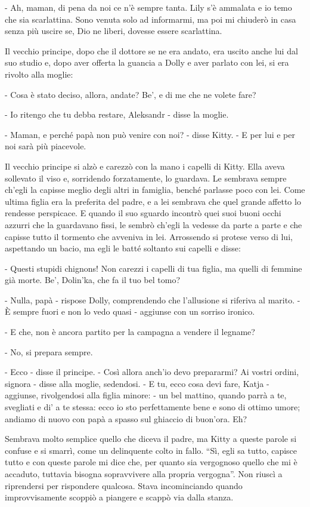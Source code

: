 - Ah, maman, di pena da noi ce n'è sempre tanta. Lily s'è ammalata e io temo che sia scarlattina. Sono venuta solo ad informarmi, ma poi mi chiuderò in casa senza più uscire se, Dio ne liberi, dovesse essere scarlattina. 

Il vecchio principe, dopo che il dottore se ne era andato, era uscito anche lui dal suo studio e, dopo aver offerta la guancia a Dolly e aver parlato con lei, si era rivolto alla moglie: 

- Cosa è stato deciso, allora, andate? Be', e di me che ne volete fare? 

- Io ritengo che tu debba restare, Aleksandr - disse la moglie. 

- Maman, e perché papà non può venire con noi? - disse Kitty. - E per lui e per noi sarà più piacevole. 

Il vecchio principe si alzò e carezzò con la mano i capelli di Kitty. Ella aveva sollevato il viso e, sorridendo forzatamente, lo guardava. Le sembrava sempre ch'egli la capisse meglio degli altri in famiglia, benché parlasse poco con lei. Come ultima figlia era la preferita del padre, e a lei sembrava che quel grande affetto lo rendesse perspicace. E quando il suo sguardo incontrò quei suoi buoni occhi azzurri che la guardavano fissi, le sembrò ch'egli la vedesse da parte a parte e che capisse tutto il tormento che avveniva in lei. Arrossendo si protese verso di lui, aspettando un bacio, ma egli le batté soltanto sui capelli e disse: 

- Questi stupidi chignons! Non carezzi i capelli di tua figlia, ma quelli di femmine già morte. Be', Dolin'ka, che fa il tuo bel tomo? 

- Nulla, papà - rispose Dolly, comprendendo che l'allusione si riferiva al marito. - È sempre fuori e non lo vedo quasi - aggiunse con un sorriso ironico. 

- E che, non è ancora partito per la campagna a vendere il legname? 

- No, si prepara sempre. 

- Ecco - disse il principe. - Così allora anch'io devo prepararmi? Ai vostri ordini, signora - disse alla moglie, sedendosi. - E tu, ecco cosa devi fare, Katja - aggiunse, rivolgendosi alla figlia minore: - un bel mattino, quando parrà a te, svegliati e di' a te stessa: ecco io sto perfettamente bene e sono di ottimo umore; andiamo di nuovo con papà a spasso sul ghiaccio di buon'ora. Eh? 

Sembrava molto semplice quello che diceva il padre, ma Kitty a queste parole si confuse e si smarrì, come un delinquente colto in fallo. ``Sì, egli sa tutto, capisce tutto e con queste parole mi dice che, per quanto sia vergognoso quello che mi è accaduto, tuttavia bisogna sopravvivere alla propria vergogna''. Non riuscì a riprendersi per rispondere qualcosa. Stava incominciando quando improvvisamente scoppiò a piangere e scappò via dalla stanza. 

